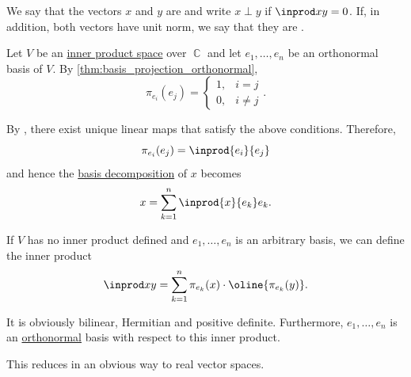 \begin{definition}\label{def:orthogonality}\mimprovised
  We say that the vectors \( x \) and \( y \) are  and write \( x \perp y \) if \( \inprod x y = 0 \). If, in addition, both vectors have unit norm, we say that they are .
\end{definition}

\begin{remark}\label{rem:inner_product_basis_decomposition}
  Let \( V \) be an \hyperref[def:inner_product_space]{inner product space} over \( \BbbC \) and let \( e_1, \ldots, e_n \) be an orthonormal basis of \( V \). By \cref{thm:basis_projection_orthonormal},
  \begin{equation*}
    \pi_{e_i}(e_j) = \begin{cases}
      1, &i = j \\
      0, &i \neq j
    \end{cases}.
  \end{equation*}

  By , there exist unique linear maps that satisfy the above conditions. Therefore,
  \begin{equation*}
    \pi_{e_i}(e_j) = \inprod {e_i} {e_j}
  \end{equation*}
  and hence the \hyperref[def:basis_decomposition]{basis decomposition} of \( x \) becomes
  \begin{equation}\label{eq:rem:inner_product_basis_decomposition/decomposition}
    x = \sum_{k=1}^n \inprod {x} {e_k} e_k.
  \end{equation}

  If \( V \) has no inner product defined and \( e_1, \ldots, e_n \) is an arbitrary basis, we can define the inner product
  \begin{equation}\label{eq:rem:inner_product_basis_decomposition/product}
    \inprod x y = \sum_{k=1}^n \pi_{e_k}(x) \cdot \oline{\pi_{e_k}(y)}.
  \end{equation}

  It is obviously bilinear, Hermitian and positive definite. Furthermore, \( e_1, \ldots, e_n \) is an \hyperref[def:orthogonality]{orthonormal} basis with respect to this inner product.

  This reduces in an obvious way to real vector spaces.
\end{remark}

